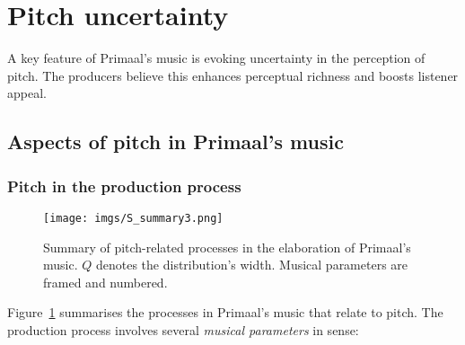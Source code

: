 \documentclass{article}
\begin{document}


\section{Pitch uncertainty}\label{sec:pitch-uncertainty}

A key feature of Primaal's music is evoking uncertainty in the perception of pitch. The producers believe this enhances perceptual richness and boosts listener appeal. 

\subsection{Aspects of pitch in Primaal's music}\label{sec:aspectsofpitch}

\subsubsection{Pitch in the production process}\label{sec:pitchdimensions}

\begin{figure}[ht]
  \centering
  \texttt{[image: imgs/S\_summary3.png]}
  \caption{Summary of pitch-related processes in the elaboration of Primaal's music. $Q$ denotes the distribution's width. Musical parameters are framed and numbered.}
\label{fig:S_summary}
\end{figure}

Figure~\ref{fig:S_summary} summarises the processes in Primaal's music that relate to pitch. The production process involves several \textit{musical parameters} in  sense:
\end{document}
